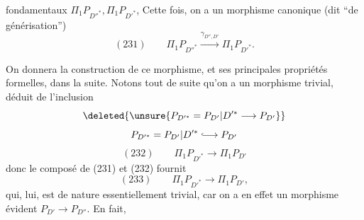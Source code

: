 fondamentaux $\Pi_1P_{D''^{*}},\Pi_1P_{D'^{*}}$, Cette fois, on a un morphisme canonique (dit ``de générisation'')
\[
(231)\qquad \boxed{\Pi_1P_{D''^{*}}\xrightarrow{\gamma_{D'',D'}}\Pi_1P_{D'^{*}}}.
\]

On donnera la  construction de ce morphisme, et ses principales propriétés formelles, dans la suite. Notons tout de suite qu'on a un morphisme trivial, déduit de l'inclusion
\[
\deleted{\unsure{P_{D'^{*}}=P_{D'}\vert D'^{*}\longrightarrow P_{D'}}}
\]
\[
P_{D'^{*}}=P_{D'}\vert D'^{*}\lhook\joinrel\longrightarrow P_{D'}
\]
\[
(232)\qquad\Pi_1P_{D'^{*}}\longrightarrow\Pi_1P_{D'}
\]
donc le composé de (231) et (232) fournit
\[
(233)\qquad\Pi_1P_{D'^{*}}\longrightarrow\Pi_1P_{D'},
\]
qui, lui, est de nature essentiellement trivial, car on a en effet un morphisme évident $P_{D'}\longrightarrow P_{D''}$. En fait,
